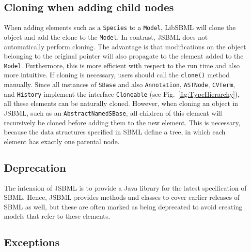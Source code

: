 \documentclass[
  BCOR12mm,
  letterpaper,
  11pt,
  headsepline,
  pointlessnumbers,
  tablecaptionabove,
  onelinecaption,
  headinclude,
  appendixprefix,
  idxtotoc,
  bibtotoc,
  twoside,
  titlepage
]{scrartcl}
\begin{document}
\subsection{Cloning when adding child nodes}

When adding elements such as a \texttt{Species} to a \texttt{Model}, LibSBML will
clone the object and add the clone to the \texttt{Model}. In contrast, JSBML does
not automatically perform cloning. The advantage is that modifications on the
object belonging to the original pointer will also propagate to the element
added to the \texttt{Model}. Furthermore, this is more efficient with respect to
the run time and also more intuitive. If cloning is necessary, users should call
the \texttt{clone()} method manually. Since all instances of \texttt{SBase} and also
\texttt{Annotation}, \texttt{ASTNode}, \texttt{CVTerm}, and \texttt{History} implement
the interface \texttt{Cloneable} (see Fig.~\vref{fig:TypeHierarchy}), all these
elements can be naturally cloned. However, when cloning an object in
JSBML, such as an \texttt{AbstractNamedSBase}, all children of this element will recursively be
cloned before adding them to the new element. This is necessary, because the data
structures specified in SBML define a tree, in
which each element has exactly one parental node.


\subsection{Deprecation}

The intension of JSBML is to provide a Java library for
the latest specification of SBML. Hence, JSBML provides methods and
classes to cover earlier releases of SBML as well, but these are often marked
as being deprecated to avoid creating models that refer to these 
elements.

\subsection{Exceptions}
\end{document}
